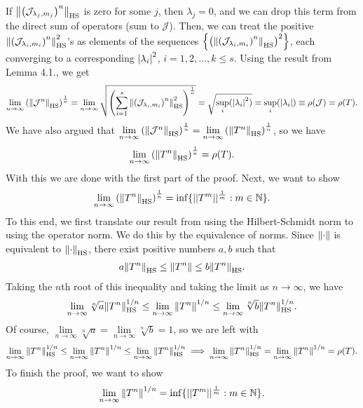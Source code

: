 \documentclass{article}
\begin{document}
If $\norm{\left(\mathcal{J}_{\lambda_j,m_j}\right)^n}_\text{HS}$ is zero for some $j$, then  $\lambda_j = 0$, and  we can drop this term from the direct sum of operators (sum to $\mathcal{J}$). Then, we can treat the positive $\norm{\left(\mathcal{J}_{\lambda_i,m_i}\right)^n}_\text{HS}^2$'s as elements of the sequences $\left\{ \left(\norm{\left(\mathcal{J}_{\lambda_i,m_i}\right)^n}_\text{HS}\right)^2\right\}$, each converging to a corresponding $\abs{\lambda_i}^2$, $i=1,2,\dots,k \leq s$. Using the result from Lemma 4.1., we get
\begin{align*}
\lim\limits_{n\to\infty}\left( \norm{\mathcal{J}^n}_\text{HS} \right)^{\frac{1}{n}}
= \lim\limits_{n\to\infty}\sqrt{ \left( \sum^{s}_{i=1} \norm{ \left( \mathcal{J}_{\lambda_i, m_i}\right)^n}_\text{HS}^2 \right)^\frac{1}{n}}= \sqrt{\sup_{i}(\abs{\lambda_i}^2)}= \sup_{i}(\abs{\lambda_i}) \equiv \rho(\mathcal{J}) = \rho(T).
\end{align*}
We have also argued that $\lim\limits_{n\to\infty}\left( \norm{\mathcal{J}^n}_\text{HS} \right)^{\frac{1}{n}} = \lim\limits_{n\to\infty}\left( \norm{T^n}_\text{HS} \right)^{\frac{1}{n}}$, so we have
\begin{align*}
\lim\limits_{n\to\infty}\left( \norm{T^n}_\text{HS} \right)^{\frac{1}{n}} = \rho(T).
\end{align*}
With this we are done with the first part of the proof. Next, we want to show 
\begin{align*}
\lim\limits_{n\to\infty}\left( \norm{T^n}_\text{HS} \right)^{\frac{1}{n}} = \inf \{  || T^m || ^\frac{1}{m} : m \in \mathbb{N} \}.
\end{align*}
To this end, we first translate our result from using the Hilbert-Schmidt norm to using the operator norm. We do this by the equivalence of norms. Since $\norm{\cdot}$ is equivalent to $\norm{\cdot}_{\text{HS}}$, there exist positive numbers $a,b$ such that
\begin{align*}
a\norm{T^n}_{\text{HS}} \leq \norm{T^n} \leq b\norm{T^n}_{\text{HS}}.
\end{align*}
Taking the $n$th root of this inequality and taking the limit as $n\to \infty$, we have
\begin{align*}
\lim\limits_{n\to \infty}\sqrt[n]{a}\norm{T^n}_{\text{HS}}^{1/n} \leq \lim\limits_{n\to \infty}\norm{T^n}^{1/n} \leq \lim\limits_{n\to \infty}\sqrt[n]{b}\norm{T^n}_{\text{HS}}^{1/n}.
\end{align*}
Of course, $\lim\limits_{n\to\infty} \sqrt[n]{a} = \lim\limits_{n\to\infty} \sqrt[n]{b} = 1$, so we are left with
\begin{align}\label{eq2}
\lim\limits_{n\to \infty}\norm{T^n}_{\text{HS}}^{1/n} \leq \lim\limits_{n\to \infty}\norm{T^n}^{1/n} \leq \lim\limits_{n\to \infty}\norm{T^n}_{\text{HS}}^{1/n} \implies \lim\limits_{n\to\infty} \norm{T^n}_\text{HS}^{1/n} = \lim\limits_{n\to \infty}\norm{T^n}^{1/n} = \rho(T).
\end{align}
To finish the proof, we want to show
\begin{align*}
\lim\limits_{n\to \infty}\norm{T^n}^{1/n} = \inf \{  || T^m || ^\frac{1}{m} : m \in \mathbb{N} \}.
\end{align*}
\end{document}
